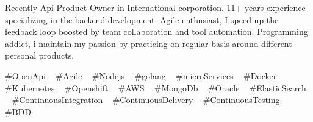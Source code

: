 

\begin{cvparagraph}

Recently Api Product Owner in International corporation. 11+ years experience specializing in the backend development.
Agile enthusiast, I speed up the feedback loop boosted by team collaboration and tool automation.
Programming addict, i maintain my passion by practicing on regular basis around different personal products.
\end{cvparagraph}
\begin{cvtechnologies}
 \#OpenApi ~
 \#Agile ~
 \#Nodejs ~
 \#golang ~
 \#microServices ~
 \#Docker ~
 \#Kubernetes ~
 \#Openshift ~
 \#AWS ~
 \#MongoDb ~
 \#Oracle ~
 \#ElasticSearch ~
 \#ContinuousIntegration ~
 \#ContinuousDelivery ~
 \#ContinuousTesting ~
 \#BDD 
\end{cvtechnologies}
